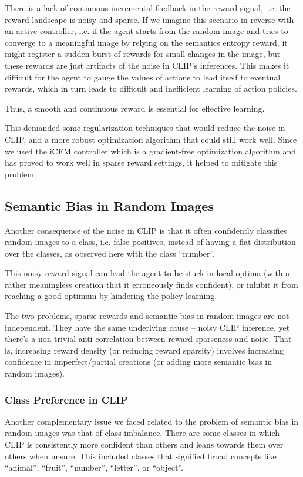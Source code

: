 There is a lack of continuous incremental feedback in the reward signal, i.e. the reward landscape is noisy and sparse.
If we imagine this scenario in reverse with an active controller, i.e. if the agent starts from the random image and tries to converge to a meaningful image by relying on the semantics entropy reward, it might register a sudden burst of rewards for small changes in the image, but these rewards are just artifacts of the noise in CLIP's inferences.
This makes it difficult for the agent to gauge the values of actions to lead itself to eventual rewards, which in turn leads to difficult and inefficient learning of action policies.

Thus, a smooth and continuous reward is essential for effective learning.

This demanded some regularization techniques that would reduce the noise in CLIP, and a more robust optimization algorithm that could still work well.
Since we used the iCEM controller which is a gradient-free optimization algorithm and has proved to work well in sparse reward settings, it helped to mitigate this problem.

\subsection{Semantic Bias in Random Images} %
\label{sec:inference-noise}
Another consequence of the noise in CLIP is that it often confidently classifies random images to a class, i.e. false positives, instead of having a flat distribution over the classes, as observed here with the class ``number''.

This noisy reward signal can lead the agent to be stuck in local optima (with a rather meaningless creation that it erroneously finds confident), or inhibit it from reaching a good optimum by hindering the policy learning.

The two problems, sparse rewards and semantic bias in random images are not independent.
They have the same underlying cause -- noisy CLIP inference, yet there's a non-trivial anti-correlation between reward sparseness and noise.
That is, increasing reward density (or reducing reward sparsity) involves increasing confidence in imperfect/partial creations (or adding more semantic bias in random images).


\subsubsection{Class Preference in CLIP}
\label{sec:class-preference}
Another complementary issue we faced related to the problem of semantic bias in random images was that of class imbalance.
There are some classes in which CLIP is consistently more confident than others and leans towards them over others when unsure.
This included classes that signified broad concepts like ``animal'', ``fruit'', ``number'', ``letter'', or ``object''.

